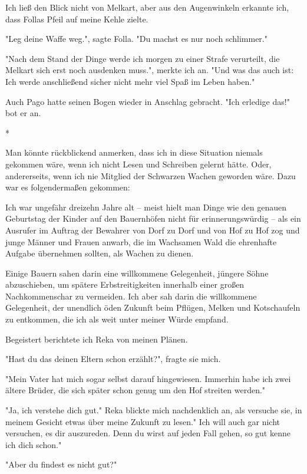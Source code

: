 \documentclass[10pt, a4paper, oneside]{book}
\begin{document}
\begin{multicols}{2}
Ich ließ den Blick nicht von Melkart, aber aus den Augenwinkeln erkannte ich, dass Follas Pfeil auf meine Kehle zielte.

"Leg deine Waffe weg.", sagte Folla. "Du machst es nur noch schlimmer."

"Nach dem Stand der Dinge werde ich morgen zu einer Strafe verurteilt, die Melkart sich erst noch ausdenken muss.", merkte ich an. "Und was das auch ist: Ich werde anschließend sicher nicht mehr viel Spaß im Leben haben."

Auch Pago hatte seinen Bogen wieder in Anschlag gebracht. "Ich erledige das!" bot er an.

\begin{center}
    *
\end{center}

Man könnte rückblickend anmerken, dass ich in diese Situation niemals gekommen wäre, wenn ich nicht Lesen und Schreiben gelernt hätte. Oder, andererseits, wenn ich nie Mitglied der Schwarzen Wachen geworden wäre. Dazu war es folgendermaßen gekommen:

Ich war ungefähr dreizehn Jahre alt – meist hielt man Dinge wie den genauen Geburtstag der Kinder auf den Bauernhöfen nicht für erinnerungswürdig – als ein Ausrufer im Auftrag der Bewahrer von Dorf zu Dorf und von Hof zu Hof zog und junge Männer und Frauen anwarb, die im Wachsamen Wald die ehrenhafte Aufgabe übernehmen sollten, als Wachen zu dienen.

Einige Bauern sahen darin eine willkommene Gelegenheit, jüngere Söhne abzuschieben, um spätere Erbstreitigkeiten innerhalb einer großen Nachkommenschar zu vermeiden. Ich aber sah darin die willkommene Gelegenheit, der unendlich öden Zukunft beim Pflügen, Melken und Kotschaufeln zu entkommen, die ich als weit unter meiner Würde empfand.

Begeistert berichtete ich Reka von meinen Plänen.

"Hast du das deinen Eltern schon erzählt?", fragte sie mich.

"Mein Vater hat mich sogar selbst darauf hingewiesen. Immerhin habe ich zwei ältere Brüder, die sich später schon genug um den Hof streiten werden."

"Ja, ich verstehe dich gut." Reka blickte mich nachdenklich an, als versuche sie, in meinem Gesicht etwas über meine Zukunft zu lesen." Ich will auch gar nicht versuchen, es dir auszureden. Denn du wirst auf jeden Fall gehen, so gut kenne ich dich schon."

"Aber du findest es nicht gut?"


\end{multicols}
\end{document}
